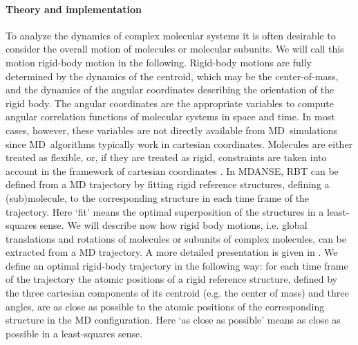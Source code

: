 \documentclass[a4paper,11pt]{article}
\begin{document}
\paragraph{Theory and implementation\\}
\label{rbt_theory}
To analyze the dynamics of complex molecular systems it is often desirable to consider the overall motion of 
molecules or molecular subunits. We will call this motion rigid-body motion in the following. Rigid-body motions 
are fully determined by the dynamics of the centroid, which may be the center-of-mass, and the dynamics of the
angular coordinates describing the orientation of the rigid body. The angular coordinates are the appropriate 
variables to compute angular correlation functions of molecular systems in space and time. In most cases, however, 
these variables are not directly available from \gls{MD}\ simulations since \gls{MD}\ algorithms typically work in cartesian coordinates. 
Molecules are either treated as flexible, or, if they are treated as rigid, constraints are taken into account in the 
framework of cartesian coordinates \cite{Berendsen}. In \gls{MDANSE}, \gls{RBT} can be defined from a 
\gls{MD} trajectory by fitting rigid reference structures, defining a (sub)molecule, to the corresponding structure in each time 
frame of the trajectory. Here `fit' means the optimal superposition of the structures in a least-squares sense. We will 
describe now how rigid body motions, i.e. global translations and rotations of molecules or  subunits of complex molecules, 
can be extracted from a \gls{MD} trajectory. A more detailed presentation is given in \cite{Kneller:1991}. We define 
an optimal rigid-body trajectory in the following way: for each time frame of the trajectory the atomic positions of a rigid 
reference structure, defined by the three cartesian components of its centroid (e.g. the center of mass) and three angles, are as 
close as possible to the atomic positions of the corresponding structure in  the \gls{MD} configuration. Here `as close as possible' means as close 
as possible in a least-squares sense.  
\end{document}
